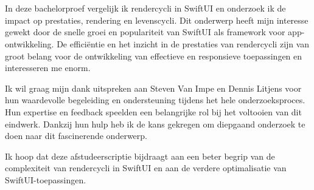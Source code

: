 
\chapter*{}%
\label{ch:voorwoord}


In deze bachelorproef vergelijk ik rendercycli in SwiftUI en onderzoek ik de impact
op prestaties, rendering en levenscycli. Dit onderwerp heeft mijn interesse gewekt door de snelle groei en populariteit van SwiftUI als framework voor
app-ontwikkeling. De efficiëntie en het inzicht in de prestaties van rendercycli
zijn van groot belang voor de ontwikkeling van effectieve en responsieve
toepassingen en interesseren me enorm.

Ik wil graag mijn dank uitspreken aan Steven Van Impe en Dennis Litjens voor hun waardevolle
begeleiding en ondersteuning tijdens het hele onderzoeksproces. Hun expertise
en feedback speelden een belangrijke rol bij het voltooien van dit
eindwerk. Dankzij hun hulp heb ik de kans gekregen om diepgaand onderzoek te doen naar dit fascinerende onderwerp.

Ik hoop dat deze afstudeerscriptie bijdraagt aan een beter begrip van de complexiteit
van rendercycli in SwiftUI en aan de verdere optimalisatie van SwiftUI-toepassingen.